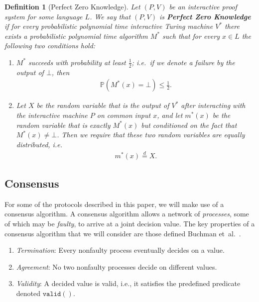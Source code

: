 \documentclass{article}
\newcommand\paper{paper}
\newcommand{\eqd}[0]{\stackrel{d}{=}}
\newtheorem{definition}{Definition}
\theoremstyle{remark}
\renewcommand{\P}{\mathbb{P}}
\begin{document}
\begin{definition}[Perfect Zero Knowledge]
	Let $(P, V)$ be an interactive proof system for some language $L$. We say
	that $(P, V)$ is \textbf{Perfect Zero Knowledge} if for every probabilistic
	polynomial time interactive Turing machine $V^\ast$ there exists a
	probabilistic polynomial time algorithm $M^\ast$ such that for every $x \in
	L$ the following two conditions hold:

	\begin{enumerate}
		\item $M^\ast$ succeeds with probability at least $\frac{1}{2}$; i.e.\
			if we denote a failure by the output of $\bot$, then
			\begin{align*}
				\P(M^\ast(x) = \bot) \le \frac{1}{2}.
			\end{align*}

		\item Let $X$ be the random variable that is the output of $V^\ast$
			after interacting with the interactive machine $P$ on common input
			$x$, and let $m^\ast(x)$ be the random variable that is exactly
			$M^\ast(x)$ but conditioned on the fact that $M^\ast(x) \ne \bot$.
			Then we require that these two random variables are equally
			distributed, i.e.
			\begin{align*}
				m^\ast(x) \eqd X.
			\end{align*}
	\end{enumerate}
\end{definition}

\subsection{Consensus}

\newcommand{\consrng}[2]{\rho_\texttt{RNG}^{#1, #2}}

For some of the protocols described in this \paper{}, we will make use of a
consensus algorithm. A consensus algorithm allows a network of
\textit{processes}, some of which may be \textit{faulty}, to arrive at a joint
decision value. The key properties of a consensus algorithm that we will
consider are those defined Buchman et~al.~\cite{buchman_2018}.

\begin{enumerate}
	\item \textit{Termination}: Every nonfaulty process eventually decides on a
		value.
	\item \textit{Agreement}: No two nonfaulty processes decide on different
		values.
	\item \textit{Validity}: A decided value is valid, i.e., it satisfies the
		predefined predicate denoted $\texttt{valid}()$.
\end{enumerate}
\end{document}
